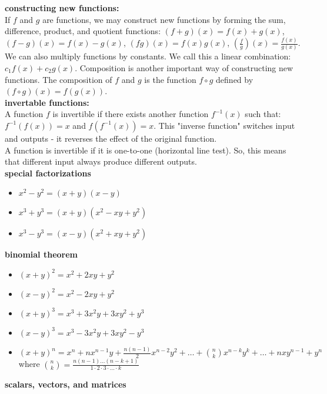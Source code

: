 \documentclass{article}
\begin{document}
\textbf{constructing new functions:}\\
If $f$ and $g$ are functions, we may construct new functions by forming the sum, difference, product, and quotient functions: $(f + g)(x) = f(x) + g(x)$, $(f - g)(x) = f(x) - g(x)$, $(fg)(x) = f(x)g(x)$, $(\frac{f}{g})(x) = \frac{f(x)}{g(x)}$. We can also multiply functions by constants. We call this a linear combination: $c_1f(x) + c_2g(x)$. Composition is another important way of constructing new functions. The composition of $f$ and $g$ is the function $f \circ g$ defined by $(f \circ g)(x) = f(g(x))$.\\

\textbf{invertable functions:}\\
A function $f$ is invertible if there exists another function $f^{-1}(x)$ such that: $f^{-1}(f(x)) = x$ and $f(f^{-1}(x)) = x$. This "inverse function" switches input and outputs - it reverses the effect of the original function.\\

A function is invertible if it is one-to-one (horizontal line test). So, this means that different input always produce different outputs.\\

\textbf{special factorizations}
	\begin{itemize}
		\item $x^2 - y^2 = (x + y)(x - y)$
		\item $x^3 + y^3 = (x + y)(x^2 - xy + y^2)$
		\item $x^3 - y^3 = (x - y)(x^2 + xy + y^2)$
	\end{itemize}

\textbf{binomial theorem}
	\begin{itemize}
		\item $(x + y)^2 = x^2 + 2xy + y^2$
		\item $(x - y)^2 = x^2 - 2xy + y^2$
		\item $(x + y)^3 = x^3 + 3x^2y + 3xy^2 + y^3$
		\item $(x - y)^3 = x^3 - 3x^2y + 3xy^2 - y^3$
		\item $(x + y)^n = x^n + nx^{n-1}y + \frac{n(n-1)}{2}x^{n-2}y^2 + \ldots + \binom{n}{k}x^{n-k}y^k + \dots + nxy^{n-1} + y^n$ where $\binom{n}{k} = \frac{n(n-1) \dots (n-k+1)}{1 \cdot 2 \cdot 3 \cdot \ldots \cdot k}$
	\end{itemize}

\textbf{scalars, vectors, and matrices}\\
\end{document}

